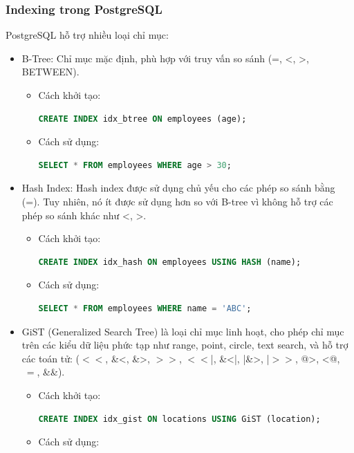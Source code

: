 \subsubsection{Indexing trong PostgreSQL}
\indent PostgreSQL hỗ trợ nhiều loại chỉ mục: 
\begin{itemize}
    \item B-Tree: Chỉ mục mặc định, phù hợp với truy vấn so sánh (=, <, >, BETWEEN).
        \begin{itemize}
            \item Cách khởi tạo:
\begin{lstlisting}[language=SQL]
CREATE INDEX idx_btree ON employees (age);
\end{lstlisting}
            \item Cách sử dụng:
\begin{lstlisting}[language=SQL]
SELECT * FROM employees WHERE age > 30;
\end{lstlisting}
        \end{itemize}
    \item Hash Index: Hash index được sử dụng chủ yếu cho các phép so sánh bằng (=). Tuy nhiên, nó ít được sử dụng hơn so với B-tree vì không hỗ trợ các phép so sánh khác như <, >.
        \begin{itemize}
            \item Cách khởi tạo:
\begin{lstlisting}[language=SQL]
CREATE INDEX idx_hash ON employees USING HASH (name);
\end{lstlisting}
            \item Cách sử dụng:
\begin{lstlisting}[language=SQL]
SELECT * FROM employees WHERE name = 'ABC';
\end{lstlisting}
        \end{itemize}
    \item GiST (Generalized Search Tree) là loại chỉ mục linh hoạt, cho phép chỉ mục trên các kiểu dữ liệu phức tạp như range, point, circle, text search, và hỗ trợ các toán tử: ($<<$,    \&<,   \&>,   $>>$,   $<<$|,   \&<|,   |\&>,   |$>>$,   @>,   <@,   $~=$,   \&\&).
        \begin{itemize}
            \item Cách khởi tạo:
\begin{lstlisting}[language=SQL]
CREATE INDEX idx_gist ON locations USING GiST (location);
\end{lstlisting}
            \item Cách sử dụng:

\end{itemize}
\end{itemize}
